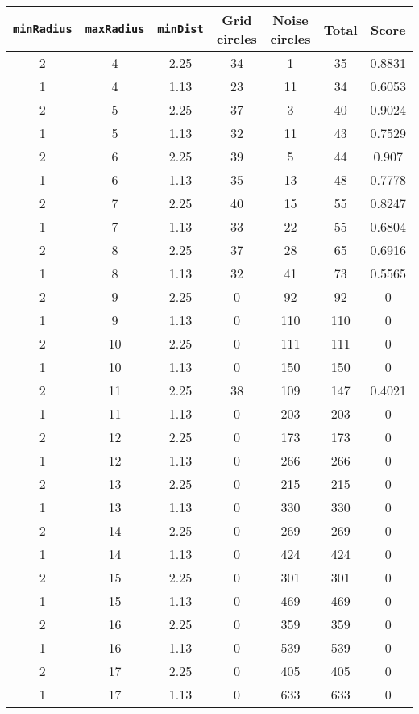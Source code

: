 \documentclass[letterpaper, 12pt]{article}
\begin{document}
\begin{longtable}{|c|c|c|c|c|c|c|}
\hline
\textbf{\texttt{minRadius}} & \textbf{\texttt{maxRadius}} & \textbf{\texttt{minDist}} & \textbf{Grid circles} & \textbf{Noise circles} & \textbf{Total} & \textbf{Score} \\
\hline
2 & 4 & 2.25 & 34 & 1 & 35 & 0.8831 \\
\hline
1 & 4 & 1.13 & 23 & 11 & 34 & 0.6053 \\
\hline
2 & 5 & 2.25 & 37 & 3 & 40 & 0.9024 \\
\hline
1 & 5 & 1.13 & 32 & 11 & 43 & 0.7529 \\
\hline
2 & 6 & 2.25 & 39 & 5 & 44 & 0.907 \\
\hline
1 & 6 & 1.13 & 35 & 13 & 48 & 0.7778 \\
\hline
2 & 7 & 2.25 & 40 & 15 & 55 & 0.8247 \\
\hline
1 & 7 & 1.13 & 33 & 22 & 55 & 0.6804 \\
\hline
2 & 8 & 2.25 & 37 & 28 & 65 & 0.6916 \\
\hline
1 & 8 & 1.13 & 32 & 41 & 73 & 0.5565 \\
\hline
2 & 9 & 2.25 & 0 & 92 & 92 & 0 \\
\hline
1 & 9 & 1.13 & 0 & 110 & 110 & 0 \\
\hline
2 & 10 & 2.25 & 0 & 111 & 111 & 0 \\
\hline
1 & 10 & 1.13 & 0 & 150 & 150 & 0 \\
\hline
2 & 11 & 2.25 & 38 & 109 & 147 & 0.4021 \\
\hline
1 & 11 & 1.13 & 0 & 203 & 203 & 0 \\
\hline
2 & 12 & 2.25 & 0 & 173 & 173 & 0 \\
\hline
1 & 12 & 1.13 & 0 & 266 & 266 & 0 \\
\hline
2 & 13 & 2.25 & 0 & 215 & 215 & 0 \\
\hline
1 & 13 & 1.13 & 0 & 330 & 330 & 0 \\
\hline
2 & 14 & 2.25 & 0 & 269 & 269 & 0 \\
\hline
1 & 14 & 1.13 & 0 & 424 & 424 & 0 \\
\hline
2 & 15 & 2.25 & 0 & 301 & 301 & 0 \\
\hline
1 & 15 & 1.13 & 0 & 469 & 469 & 0 \\
\hline
2 & 16 & 2.25 & 0 & 359 & 359 & 0 \\
\hline
1 & 16 & 1.13 & 0 & 539 & 539 & 0 \\
\hline
2 & 17 & 2.25 & 0 & 405 & 405 & 0 \\
\hline
1 & 17 & 1.13 & 0 & 633 & 633 & 0 \\

\end{longtable}
\end{document}

